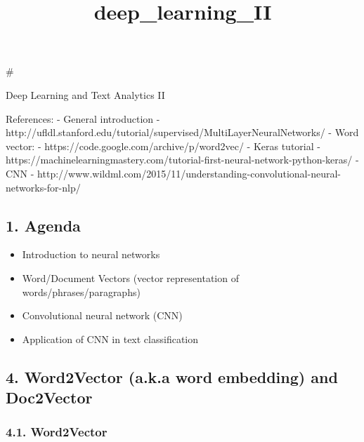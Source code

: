 \documentclass[11pt]{article}
\title{deep\_learning\_II}
\providecommand{\tightlist}{%
      \setlength{\itemsep}{0pt}\setlength{\parskip}{0pt}}
\begin{document}
    
    
    \maketitle
    
    

    
    \#

Deep Learning and Text Analytics II

References: - General introduction -
http://ufldl.stanford.edu/tutorial/supervised/MultiLayerNeuralNetworks/
- Word vector: - https://code.google.com/archive/p/word2vec/ - Keras
tutorial -
https://machinelearningmastery.com/tutorial-first-neural-network-python-keras/
- CNN -
http://www.wildml.com/2015/11/understanding-convolutional-neural-networks-for-nlp/

    \hypertarget{agenda}{%
\subsection{1. Agenda}\label{agenda}}

\begin{itemize}
\tightlist
\item
  Introduction to neural networks
\item
  Word/Document Vectors (vector representation of
  words/phrases/paragraphs)
\item
  Convolutional neural network (CNN)
\item
  Application of CNN in text classification
\end{itemize}

    \hypertarget{word2vector-a.k.a-word-embedding-and-doc2vector}{%
\subsection{4. Word2Vector (a.k.a word embedding) and
Doc2Vector}\label{word2vector-a.k.a-word-embedding-and-doc2vector}}

\hypertarget{word2vector}{%
\subsubsection{4.1. Word2Vector}\label{word2vector}}
\end{document}
